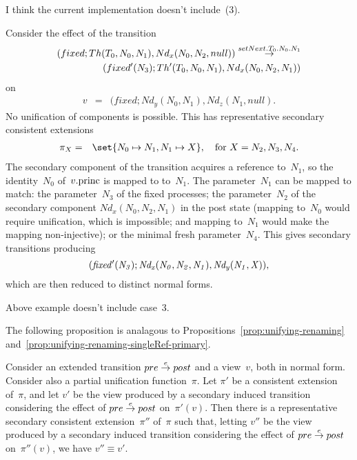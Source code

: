  I think the current implementation doesn't include~(3). 


\begin{example}
Consider the effect of the transition
\[
\begin{align}
(fixed; Th(T_0,N_0,N_1), Nd_x(N_0,N_2,null))   \stackrel{setNext.T_0.N_0.N_1}\rightarrow \\
\qquad (fixed'(N_3); Th'(T_0,N_0,N_1), Nd_x(N_0,N_2,N_1)) 
\end{align}
\]
on
\begin{eqnarray*}
v & = &  (fixed; Nd_y(N_0,N_1), Nd_z(N_1,null).
\end{eqnarray*}
%
No unification of components is possible.
This has representative secondary consistent extensions
\begin{eqnarray*}
\pi_X & = & \set{N_0 \mapsto N_1, N_1 \mapsto X},
  \quad \mbox{for $X = N_2, N_3, N_4$}.
\end{eqnarray*}
%
The secondary component of the transition acquires a reference to~$N_1$, so
the identity~$N_0$ of~$v.\mathrm{princ}$ is mapped to to~$N_1$.  The parameter~$N_1$
can be mapped to match: the parameter~$N_3$ of the fixed processes; the
parameter~$N_2$ of the secondary component $Nd_x(N_0,N_2,N_1)$ in the post
state (mapping to~$N_0$ would require unification, which is impossible; and
mapping to~$N_1$ would make the mapping non-injective); or the minimal fresh
parameter~$N_4$.
%
This gives secondary transitions producing
\[{\it
(fixed'(N_3); Nd_x(N_0,N_2,N_1), Nd_y(N_1,X)),}
\] 
which are then reduced to distinct normal forms.
\end{example}

\framebox{***} Above example doesn't include case~3.


The following proposition is analagous to
Propositions~\ref{prop:unifying-renaming}
and~\ref{prop:unifying-renaming-singleRef-primary}.
%
\begin{prop}
\label{prop:unifying-renaming-singleRef-secondary}
Consider an extended transition $pre \stackrel{e}\rightarrow post$ and a view~$v$, both in
normal form.  Consider also a partial unification function~$\pi$.
%
Let $\pi'$ be a consistent extension of~$\pi$, and let $v'$ be the view
produced by a secondary induced transition considering the effect of $pre
\stackrel{e}\rightarrow post$ on~$\pi'(v)$.
%
Then there is a representative secondary consistent extension~$\pi''$ of~$\pi$
such that, letting $v''$ be the view produced by a secondary induced
transition considering the effect of $pre \stackrel{e}\rightarrow post$ on~$\pi''(v)$, we
have $v'' \equiv v'$.
\end{prop}

